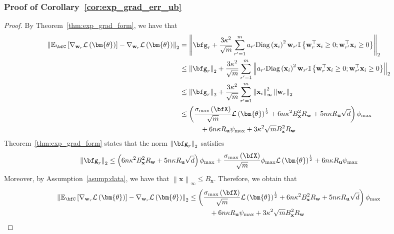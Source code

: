 \documentclass[10pt]{article} %
\theoremstyle{definition}
\theoremstyle{plain}
\newcommand{\paren}[1]{\left(#1\right)}
\newcommand{\norm}[1]{\left\|#1\right\|}
\providecommand{\E}{\mathbb{E}}
\def\calL{{\mathcal{L}}}
\def\bfu{{\mathbf{u}}}\def\bfv{{\mathbf{v}}}\def\bfw{{\mathbf{w}}}\def\bfx{{\mathbf{x}}}
\begin{document}
\subsubsection{Proof of Corollary~\ref{cor:exp_grad_err_ub}}
\begin{proof}
    By Theorem~\ref{thm:exp_grad_form}, we have that
    \begin{align*}
        \norm{\E_{\bfC}\left[\nabla_{\bfw_r}\calL\paren{\bm{\theta}}\right] - \nabla_{\bfw_r}\calL\paren{\bm{\theta}}}_2 & = \norm{\bfg_r + \frac{3\kappa^2}{\sqrt{m}}\sum_{r'=1}^ma_{r'}\text{Diag}\paren{\bfx_i}^2\bfw_{r'}\mathbb{I}\left\{\bfw_{r}^\top\bfx_i\geq 0;\bfw_{r'}^\top\bfx_i\geq 0\right\}}_2\\
        & \leq \norm{\bfg_r}_2 + \frac{3\kappa^2}{\sqrt{m}}\sum_{r'=1}^m\norm{a_{r'}\text{Diag}\paren{\bfx_i}^2\bfw_{r'}\mathbb{I}\left\{\bfw_{r}^\top\bfx_i\geq 0;\bfw_{r'}^\top\bfx_i\geq 0\right\}}_2\\
        & \leq \norm{\bfg_r}_2 + \frac{3\kappa^2}{\sqrt{m}}\sum_{r'=1}^m\norm{\bfx_i}_{\infty}^2\norm{\bfw_r}_2\\
        & \leq \paren{\frac{\sigma_{\max}\paren{\bfX}}{\sqrt{m}}\calL\paren{\bm{\theta}}^{\frac{1}{2}} + 6n\kappa^2B_{\bfx}^2R_{\bfw} + 5n\kappa R_{\bfu}\sqrt{d}}\phi_{\max}\\
        & \quad\quad\quad + 6n\kappa R_{\bfu}\psi_{\max}+3\kappa^2\sqrt{m}B_{\bfx}^2R_{\bfw}
    \end{align*}
    Theorem~\ref{thm:exp_grad_form} states that the norm $\norm{\bfg_r}_2$ satisfies
    \[
        \norm{\bfg_r}_2 \leq \paren{6n\kappa^2B_{\bfx}^2R_{\bfw} + 5n\kappa R_{\bfu}\sqrt{d}}\phi_{\max} + \frac{\sigma_{\max}\paren{\bfX}}{\sqrt{m}}\phi_{\max}\calL\paren{\bm{\theta}}^{\frac{1}{2}}+ 6n\kappa R_{\bfu}\psi_{\max}
    \]
    Moreover, by Assumption~\ref{asump:data}, we have that $\norm{\bfx}_{\infty}\leq B_{\bfx}$. Therefore, we obtain that
    \begin{align*}
        \norm{\E_{\bfC}\left[\nabla_{\bfw_r}\calL\paren{\bm{\theta}}\right] - \nabla_{\bfw_r}\calL\paren{\bm{\theta}}}_2 & \leq \paren{\frac{\sigma_{\max}\paren{\bfX}}{\sqrt{m}}\calL\paren{\bm{\theta}}^{\frac{1}{2}} + 6n\kappa^2B_{\bfx}^2R_{\bfw} + 5n\kappa R_{\bfu}\sqrt{d}}\phi_{\max}\\
        & \quad\quad\quad + 6n\kappa R_{\bfu}\psi_{\max}+3\kappa^2\sqrt{m}B_{\bfx}^2R_{\bfw}
    \end{align*}
\end{proof}
\end{document}
